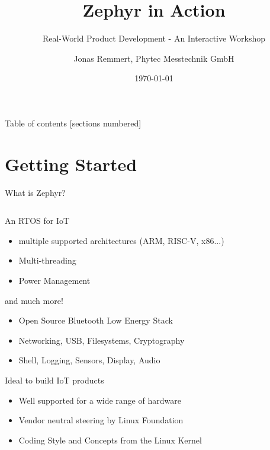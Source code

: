 \documentclass[10pt, aspectratio=169]{beamer}
\title{Zephyr in Action}
\subtitle{Real-World Product Development - An Interactive Workshop}
\date{\today}
\author{Jonas Remmert, Phytec Messtechnik GmbH}
\begin{document}
\maketitle

\begin{frame}{Table of contents}
  [sections numbered]
  \tableofcontents[hideallsubsections]
\end{frame}

\section{Getting Started}

\begin{frame}[fragile]{What is Zephyr?}

  \begin{columns}

    \begin{column}{0.6\textwidth}
      \begin{block}{An RTOS for IoT}
        \begin{itemize}
          \item multiple supported architectures (ARM, RISC-V, x86...)
          \item Multi-threading
          \item Power Management
        \end{itemize}
      \end{block}
      \begin{block}{and much more!}
        \begin{itemize}
          \item Open Source Bluetooth Low Energy Stack
          \item Networking, USB, Filesystems, Cryptography
          \item Shell, Logging, Sensors, Display, Audio
        \end{itemize}
      \end{block}
      \begin{block}{Ideal to build IoT products}
        \begin{itemize}
          \item Well supported for a wide range of hardware
          \item Vendor neutral steering by Linux Foundation
          \item Coding Style and Concepts from the Linux Kernel
        \end{itemize}
      \end{block}
    \end{column}


\end{columns}
\end{frame}
\end{document}
